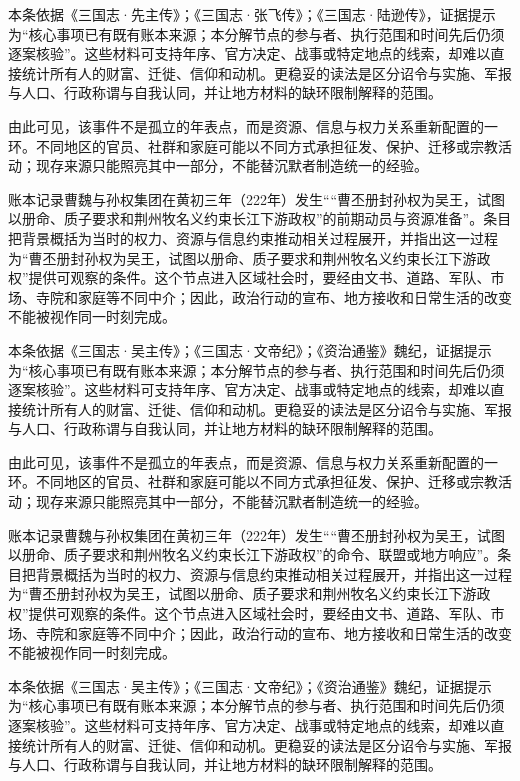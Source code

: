本条依据《三国志·先主传》；《三国志·张飞传》；《三国志·陆逊传》，证据提示为“核心事项已有既有账本来源；本分解节点的参与者、执行范围和时间先后仍须逐案核验”。这些材料可支持年序、官方决定、战事或特定地点的线索，却难以直接统计所有人的财富、迁徙、信仰和动机。更稳妥的读法是区分诏令与实施、军报与人口、行政称谓与自我认同，并让地方材料的缺环限制解释的范围。

由此可见，该事件不是孤立的年表点，而是资源、信息与权力关系重新配置的一环。不同地区的官员、社群和家庭可能以不同方式承担征发、保护、迁移或宗教活动；现存来源只能照亮其中一部分，不能替沉默者制造统一的经验。

账本记录曹魏与孙权集团在黄初三年（222年）发生““曹丕册封孙权为吴王，试图以册命、质子要求和荆州牧名义约束长江下游政权”的前期动员与资源准备”。条目把背景概括为当时的权力、资源与信息约束推动相关过程展开，并指出这一过程为“曹丕册封孙权为吴王，试图以册命、质子要求和荆州牧名义约束长江下游政权”提供可观察的条件。这个节点进入区域社会时，要经由文书、道路、军队、市场、寺院和家庭等不同中介；因此，政治行动的宣布、地方接收和日常生活的改变不能被视作同一时刻完成。

本条依据《三国志·吴主传》；《三国志·文帝纪》；《资治通鉴》魏纪，证据提示为“核心事项已有既有账本来源；本分解节点的参与者、执行范围和时间先后仍须逐案核验”。这些材料可支持年序、官方决定、战事或特定地点的线索，却难以直接统计所有人的财富、迁徙、信仰和动机。更稳妥的读法是区分诏令与实施、军报与人口、行政称谓与自我认同，并让地方材料的缺环限制解释的范围。

由此可见，该事件不是孤立的年表点，而是资源、信息与权力关系重新配置的一环。不同地区的官员、社群和家庭可能以不同方式承担征发、保护、迁移或宗教活动；现存来源只能照亮其中一部分，不能替沉默者制造统一的经验。

账本记录曹魏与孙权集团在黄初三年（222年）发生““曹丕册封孙权为吴王，试图以册命、质子要求和荆州牧名义约束长江下游政权”的命令、联盟或地方响应”。条目把背景概括为当时的权力、资源与信息约束推动相关过程展开，并指出这一过程为“曹丕册封孙权为吴王，试图以册命、质子要求和荆州牧名义约束长江下游政权”提供可观察的条件。这个节点进入区域社会时，要经由文书、道路、军队、市场、寺院和家庭等不同中介；因此，政治行动的宣布、地方接收和日常生活的改变不能被视作同一时刻完成。

本条依据《三国志·吴主传》；《三国志·文帝纪》；《资治通鉴》魏纪，证据提示为“核心事项已有既有账本来源；本分解节点的参与者、执行范围和时间先后仍须逐案核验”。这些材料可支持年序、官方决定、战事或特定地点的线索，却难以直接统计所有人的财富、迁徙、信仰和动机。更稳妥的读法是区分诏令与实施、军报与人口、行政称谓与自我认同，并让地方材料的缺环限制解释的范围。

